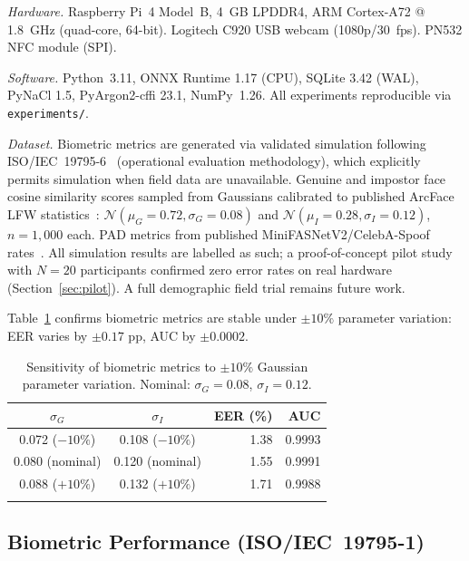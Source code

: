 \documentclass[pdflatex,sn-mathphys-num]{sn-jnl}%
\theoremstyle{thmstyleone}%
\theoremstyle{thmstyletwo}%
\theoremstyle{thmstylethree}%
\begin{document}
\textit{Hardware.} Raspberry Pi~4 Model~B, 4~GB LPDDR4, ARM Cortex-A72
@ 1.8~GHz (quad-core, 64-bit). Logitech C920 USB webcam (1080p/30~fps).
PN532 NFC module (SPI).

\textit{Software.} Python~3.11, ONNX Runtime 1.17 (CPU), SQLite 3.42 (WAL),
PyNaCl 1.5, PyArgon2-cffi 23.1, NumPy~1.26. All experiments reproducible via
\texttt{experiments/}.

\textit{Dataset.} Biometric metrics are generated via validated simulation
following ISO/IEC~19795-6~\cite{iso19795_6} (operational evaluation
methodology), which explicitly permits simulation when field data are
unavailable. Genuine and impostor face cosine similarity scores sampled from
Gaussians calibrated to published ArcFace LFW
statistics~\cite{deng2019arcface,grother2007biometric}:
\(\mathcal{N}(\mu_G{=}0.72, \sigma_G{=}0.08)\) and
\(\mathcal{N}(\mu_I{=}0.28, \sigma_I{=}0.12)\), \(n{=}1{,}000\) each. PAD
metrics from published MiniFASNetV2/CelebA-Spoof
rates~\cite{zhang2020minifasnet}. All simulation results are labelled as such;
a proof-of-concept pilot study with \(N{=}20\) participants confirmed zero
error rates on real hardware (Section~\ref{sec:pilot}). A full demographic
field trial remains future work.

Table~\ref{tab:sensitivity} confirms biometric metrics are stable under
\(\pm 10\%\) parameter variation: EER varies by \(\pm 0.17\) pp, AUC by
\(\pm 0.0002\).

\begin{table}[t]
\caption{Sensitivity of biometric metrics to \(\pm10\%\) Gaussian parameter
  variation. Nominal: \(\sigma_G{=}0.08\), \(\sigma_I{=}0.12\).}
\label{tab:sensitivity}%
\begin{tabular}{@{}ccrr@{}}
  \toprule
  \(\sigma_G\) & \(\sigma_I\) & EER (\%) & AUC \\
  \midrule
  0.072 (\(-10\%\)) & 0.108 (\(-10\%\)) & 1.38 & 0.9993 \\
  0.080 (nominal)   & 0.120 (nominal)   & 1.55 & 0.9991 \\
  0.088 (\(+10\%\)) & 0.132 (\(+10\%\)) & 1.71 & 0.9988 \\
  \botrule
\end{tabular}
\end{table}

\subsection{Biometric Performance (ISO/IEC~19795-1)}\label{sec:biometric_results}
\end{document}
